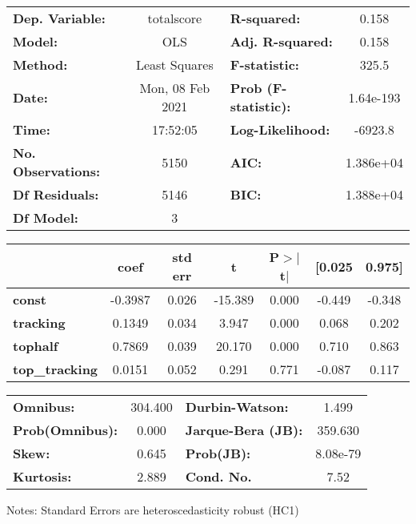 \begin{center}
\begin{tabular}{lclc}
\toprule
\textbf{Dep. Variable:}    &    totalscore    & \textbf{  R-squared:         } &     0.158   \\
\textbf{Model:}            &       OLS        & \textbf{  Adj. R-squared:    } &     0.158   \\
\textbf{Method:}           &  Least Squares   & \textbf{  F-statistic:       } &     325.5   \\
\textbf{Date:}             & Mon, 08 Feb 2021 & \textbf{  Prob (F-statistic):} & 1.64e-193   \\
\textbf{Time:}             &     17:52:05     & \textbf{  Log-Likelihood:    } &   -6923.8   \\
\textbf{No. Observations:} &        5150      & \textbf{  AIC:               } & 1.386e+04   \\
\textbf{Df Residuals:}     &        5146      & \textbf{  BIC:               } & 1.388e+04   \\
\textbf{Df Model:}         &           3      & \textbf{                     } &             \\
\bottomrule
\end{tabular}
\begin{tabular}{lcccccc}
                       & \textbf{coef} & \textbf{std err} & \textbf{t} & \textbf{P$> |$t$|$} & \textbf{[0.025} & \textbf{0.975]}  \\
\midrule
\textbf{const}         &      -0.3987  &        0.026     &   -15.389  &         0.000        &       -0.449    &       -0.348     \\
\textbf{tracking}      &       0.1349  &        0.034     &     3.947  &         0.000        &        0.068    &        0.202     \\
\textbf{tophalf}       &       0.7869  &        0.039     &    20.170  &         0.000        &        0.710    &        0.863     \\
\textbf{top\_tracking} &       0.0151  &        0.052     &     0.291  &         0.771        &       -0.087    &        0.117     \\
\bottomrule
\end{tabular}
\begin{tabular}{lclc}
\textbf{Omnibus:}       & 304.400 & \textbf{  Durbin-Watson:     } &    1.499  \\
\textbf{Prob(Omnibus):} &   0.000 & \textbf{  Jarque-Bera (JB):  } &  359.630  \\
\textbf{Skew:}          &   0.645 & \textbf{  Prob(JB):          } & 8.08e-79  \\
\textbf{Kurtosis:}      &   2.889 & \textbf{  Cond. No.          } &     7.52  \\
\bottomrule
\end{tabular}
\end{center}

Notes: \newline
 [1] Standard Errors are heteroscedasticity robust (HC1)

